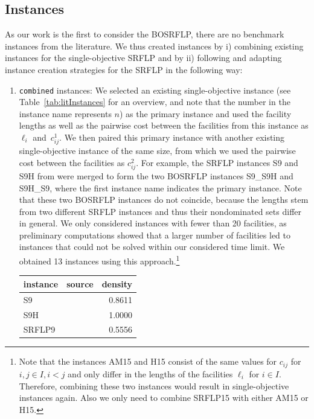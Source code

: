 \documentclass{article}
\newcommand{\SRFLP}{SRFLP\xspace}
\newcommand{\BOSRFLP}{BOSRFLP\xspace}
\begin{document}
\subsection{Instances}\label{sec:instances}
As our work is the first to consider the \BOSRFLP, there are no benchmark instances from the literature. We thus created instances by i) combining existing instances for the single-objective \SRFLP and by ii) following and adapting instance creation strategies for the \SRFLP in the following way:
\begin{enumerate}[label=(\roman*)]
\item \texttt{combined} instances: We selected an existing single-objective instance (see Table~\ref{tab:litInstances} for an overview, and note that the number in the instance name represents $n$) as the primary instance and used the facility lengths as well as the pairwise cost between the facilities from this instance as $\ell_i$ and~$c^1_{ij}$. We then paired this primary instance with another existing single-objective instance of the same size, from which we used the pairwise cost between the facilities as $c^2_{ij}$. For example, the \SRFLP instances S9 and S9H from \citet{SIMMONS1969} were merged to form the two \BOSRFLP instances S9\_S9H and S9H\_S9, where the first instance name indicates the primary instance.
Note that these two \BOSRFLP instances do not coincide, because the lengths stem from two different \SRFLP instances and thus their nondominated sets differ in general. We only considered instances with fewer than 20 facilities, as preliminary computations showed that a larger number of facilities led to instances that could not be solved within our considered time limit. We obtained 13 instances using this approach.\footnote{Note that the instances AM15 and H15 consist of the same values for $c_{ij}$ for $i,j \in I, i<j$ and only differ in the lengths of the facilities $\ell_i$ for $i\in I$. Therefore, combining these two instances would result in single-objective instances again. Also we only need to combine SRFLP15 with either AM15 or H15.}
\begin{table}[htb]
    \centering
    \begin{tabular}{llr}
    \toprule
        instance & source & density\\
        \midrule
        S9 &  \citet{SIMMONS1969} & 0.8611\\
        S9H &  \citet{SIMMONS1969} & 1.0000\\
        SRFLP9 & \citet{Hungerlander2012Tech} & 0.5556\\

\end{tabular}
\end{table}
\end{enumerate}
\end{document}
